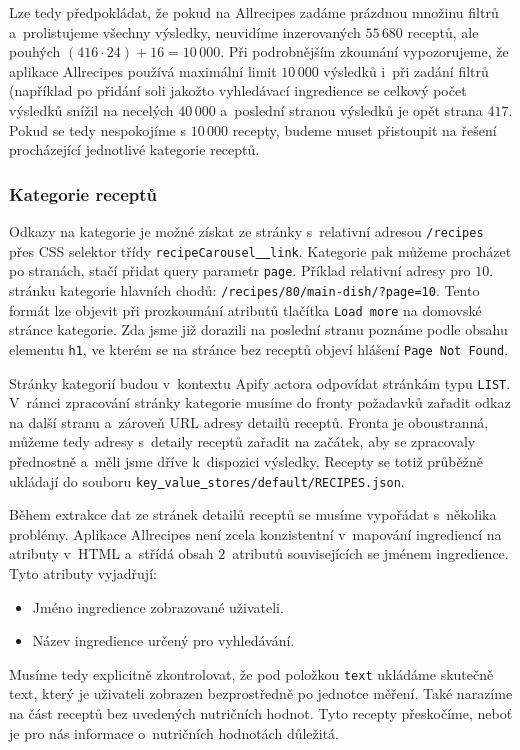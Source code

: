 Lze tedy předpokládat, že pokud na Allrecipes zadáme prázdnou množinu filtrů a~prolistujeme všechny výsledky, neuvidíme inzerovaných $55\,680$ receptů, ale pouhých $(416 \cdot 24) + 16 = 10\,000$. Při podrobnějším zkoumání vypozorujeme, že aplikace Allrecipes používá maximální limit $10\,000$ výsledků i~při zadání filtrů (například po přidání soli jakožto vyhledávací ingredience se celkový počet výsledků snížil na necelých $40\,000$ a~poslední stranou výsledků je opět strana $417$. Pokud se tedy nespokojíme s $10\,000$ recepty, budeme muset přistoupit na řešení procházející jednotlivé kategorie receptů.

\subsubsection{Kategorie receptů}

Odkazy na kategorie je možné získat ze stránky s~relativní adresou \texttt{/recipes} přes CSS selektor třídy \texttt{recipeCarousel\underline{{ }{ }}link}. Kategorie pak můžeme procházet po stranách, stačí přidat query parametr \texttt{page}. Příklad relativní adresy pro $10$. stránku kategorie hlavních chodů: \texttt{/recipes/80/main-dish/?page=10}. Tento formát lze objevit při prozkoumání atributů tlačítka \texttt{Load\,more} na domovské stránce kategorie. Zda jsme již dorazili na poslední stranu poznáme podle obsahu elementu \texttt{h1}, ve kterém se na stránce bez receptů objeví hlášení \texttt{Page\,Not\,Found}.

Stránky kategorií budou v~kontextu Apify actora odpovídat stránkám typu \texttt{LIST}. V~rámci zpracování stránky kategorie musíme do fronty požadavků zařadit odkaz na další stranu a~zároveň URL adresy detailů receptů. Fronta je oboustranná, můžeme tedy adresy s~detaily receptů zařadit na začátek, aby se zpracovaly přednostně a~měli jsme dříve k~dispozici výsledky. Recepty se totiž průběžně ukládají do souboru \texttt{key\underline{{ }}value\underline{{ }}stores/default/RECIPES.json}.

Během extrakce dat ze stránek detailů receptů se musíme vypořádat s~několika problémy. Aplikace Allrecipes není zcela konzistentní v~mapování ingrediencí na atributy v~HTML a~střídá obsah $2$~atributů souvisejících se jménem ingredience. Tyto atributy vyjadřují:
\begin{itemize}
    \item Jméno ingredience zobrazované uživateli.
    \item Název ingredience určený pro vyhledávání.
\end{itemize}
Musíme tedy explicitně zkontrolovat, že pod položkou \texttt{text} ukládáme skutečně text, který je uživateli zobrazen bezprostředně po jednotce měření. Také narazíme na část receptů bez uvedených nutričních hodnot. Tyto recepty přeskočíme, neboť je pro nás informace o~nutričních hodnotách důležitá.

